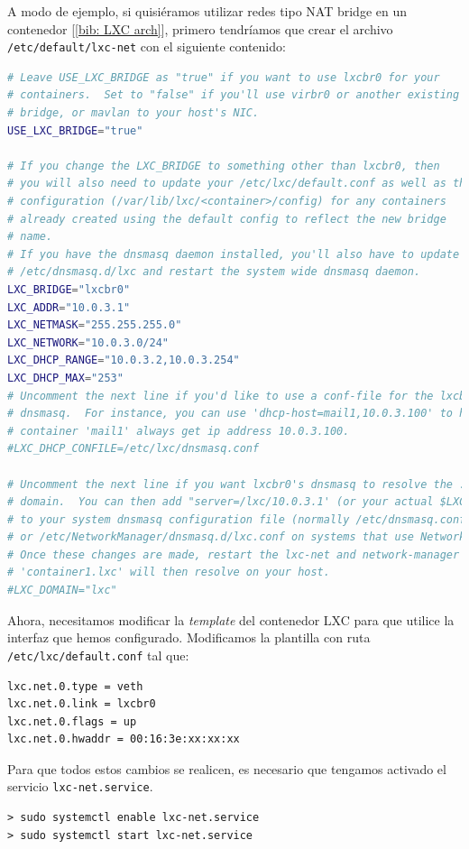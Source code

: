\documentclass[12pt]{article}
\begin{document}
	\noindent A modo de ejemplo, si quisiéramos utilizar redes tipo NAT bridge en un contenedor [\ref{bib: LXC arch}], primero tendríamos que crear el archivo \texttt{/etc/default/lxc-net} con el siguiente contenido:
	\begin{lstlisting}[language=Bash, caption={Configuración interfaz NAT bridge en LXC}]
# Leave USE_LXC_BRIDGE as "true" if you want to use lxcbr0 for your
# containers.  Set to "false" if you'll use virbr0 or another existing
# bridge, or mavlan to your host's NIC.
USE_LXC_BRIDGE="true"

# If you change the LXC_BRIDGE to something other than lxcbr0, then
# you will also need to update your /etc/lxc/default.conf as well as the
# configuration (/var/lib/lxc/<container>/config) for any containers
# already created using the default config to reflect the new bridge
# name.
# If you have the dnsmasq daemon installed, you'll also have to update
# /etc/dnsmasq.d/lxc and restart the system wide dnsmasq daemon.
LXC_BRIDGE="lxcbr0"
LXC_ADDR="10.0.3.1"
LXC_NETMASK="255.255.255.0"
LXC_NETWORK="10.0.3.0/24"
LXC_DHCP_RANGE="10.0.3.2,10.0.3.254"
LXC_DHCP_MAX="253"
# Uncomment the next line if you'd like to use a conf-file for the lxcbr0
# dnsmasq.  For instance, you can use 'dhcp-host=mail1,10.0.3.100' to have
# container 'mail1' always get ip address 10.0.3.100.
#LXC_DHCP_CONFILE=/etc/lxc/dnsmasq.conf

# Uncomment the next line if you want lxcbr0's dnsmasq to resolve the .lxc
# domain.  You can then add "server=/lxc/10.0.3.1' (or your actual $LXC_ADDR)
# to your system dnsmasq configuration file (normally /etc/dnsmasq.conf,
# or /etc/NetworkManager/dnsmasq.d/lxc.conf on systems that use NetworkManager).
# Once these changes are made, restart the lxc-net and network-manager services.
# 'container1.lxc' will then resolve on your host.
#LXC_DOMAIN="lxc"
	\end{lstlisting}

	\pagebreak

	\noindent Ahora, necesitamos modificar la \textit{template} del contenedor LXC para que utilice la interfaz que hemos configurado. Modificamos la plantilla con ruta \texttt{/etc/lxc/default.conf} tal que:
	\begin{lstlisting}[language=Bash, caption={Configuración contenedor LXC para usar NAT bridge}]
lxc.net.0.type = veth
lxc.net.0.link = lxcbr0
lxc.net.0.flags = up
lxc.net.0.hwaddr = 00:16:3e:xx:xx:xx
	\end{lstlisting}

	\noindent Para que todos estos cambios se realicen, es necesario que tengamos activado el servicio \texttt{lxc-net.service}.
	\begin{verbatim}
> sudo systemctl enable lxc-net.service
> sudo systemctl start lxc-net.service
	\end{verbatim}
\end{document}
